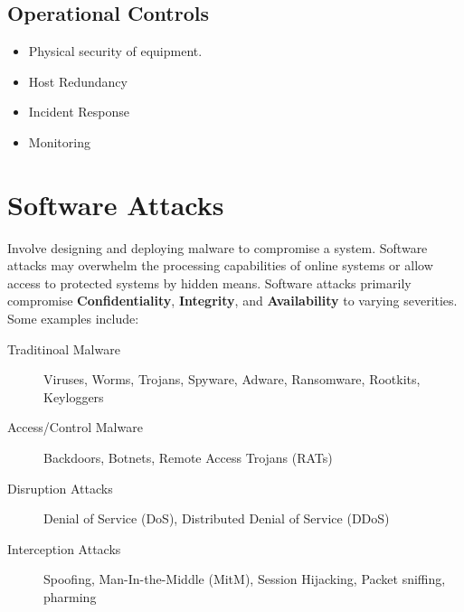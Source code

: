 \documentclass[12pt letter]{report}
\begin{document}
\subsection{Operational Controls}
\begin{itemize}
  \item Physical security of equipment.
  \item Host Redundancy
  \item Incident Response
  \item Monitoring
\end{itemize}

\section{Software Attacks}


Involve designing and deploying malware to compromise a system. Software attacks may overwhelm the processing capabilities of online systems or allow access to protected systems by hidden means. Software attacks primarily compromise \textbf{Confidentiality}, \textbf{Integrity}, and \textbf{Availability} to varying severities. Some examples include:
\begin{description}
  \item[Traditinoal Malware] Viruses, Worms, Trojans, Spyware, Adware, Ransomware, Rootkits, Keyloggers
  \item[Access/Control Malware] Backdoors, Botnets, Remote Access Trojans (RATs)
  \item[Disruption Attacks] Denial of Service (DoS), Distributed Denial of Service (DDoS)
  \item[Interception Attacks] Spoofing, Man-In-the-Middle (MitM), Session Hijacking, Packet sniffing, pharming
\end{description}



\end{document}
